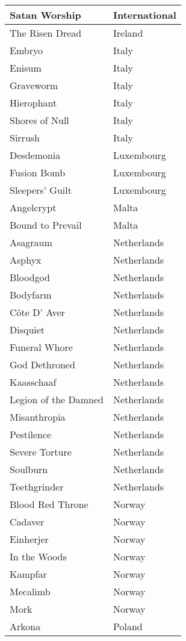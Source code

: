 \documentclass[12pt, a4paper, twoside]{report}
\begin{document}
\begin{center}
\begin{longtable}{|p{5cm}|p{5cm}|}
Satan Worship & International \\ \hline
The Risen Dread & Ireland \\ \hline
Embryo & Italy \\ \hline
Enisum & Italy \\ \hline
Graveworm & Italy \\ \hline
Hierophant & Italy \\ \hline
Shores of Null & Italy \\ \hline
Sirrush & Italy \\ \hline
Desdemonia & Luxembourg \\ \hline
Fusion Bomb & Luxembourg \\ \hline
Sleepers' Guilt & Luxembourg \\ \hline
Angelcrypt & Malta \\ \hline
Bound to Prevail & Malta \\ \hline
Asagraum & Netherlands \\ \hline
Asphyx & Netherlands \\ \hline
Bloodgod & Netherlands \\ \hline
Bodyfarm & Netherlands \\ \hline
Côte D' Aver & Netherlands \\ \hline
Disquiet & Netherlands \\ \hline
Funeral Whore & Netherlands \\ \hline
God Dethroned & Netherlands \\ \hline
Kaasschaaf & Netherlands \\ \hline
Legion of the Damned & Netherlands \\ \hline
Misanthropia & Netherlands \\ \hline
Pestilence & Netherlands \\ \hline
Severe Torture & Netherlands \\ \hline
Soulburn & Netherlands \\ \hline
Teethgrinder & Netherlands \\ \hline
Blood Red Throne & Norway \\ \hline
Cadaver & Norway \\ \hline
Einherjer & Norway \\ \hline
In the Woods & Norway \\ \hline
Kampfar & Norway \\ \hline
Mecalimb & Norway \\ \hline
Mork & Norway \\ \hline
Arkona & Poland \\ \hline

\end{longtable}
\end{center}
\end{document}
